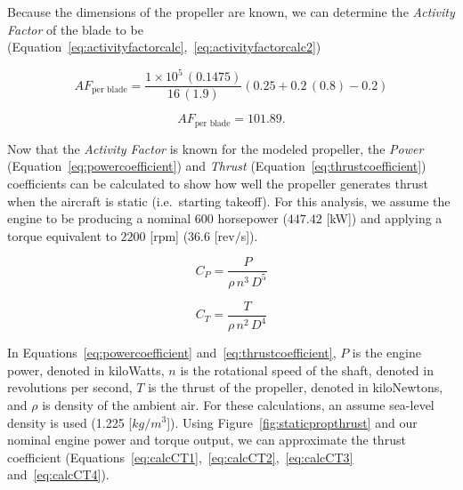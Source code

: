 Because the dimensions of the propeller are known, we can determine the \textit{Activity Factor} of the blade to be (Equation~\ref{eq:activityfactorcalc},~\ref{eq:activityfactorcalc2})

\begin{equation}\label{eq:activityfactorcalc}
    AF_{\textrm{per blade}} = \frac{1 \times 10^5 \, (0.1475)}{16 \, (1.9)} \left(0.25 + 0.2 \, (0.8) - 0.2 \right)
\end{equation}

\begin{equation}\label{eq:activityfactorcalc2}
    AF_{\textrm{per blade}} = 101.89.
\end{equation}

Now that the \textit{Activity Factor} is known for the modeled propeller, the \textit{Power} (Equation~\ref{eq:powercoefficient}) and \textit{Thrust} (Equation~\ref{eq:thrustcoefficient}) coefficients can be calculated to show how well the propeller generates thrust when the aircraft is static (i.e.\ starting takeoff). For this analysis, we assume the engine to be producing a nominal \(600\) horsepower (\(447.42\) [kW]) and applying a torque equivalent to \(2200\) [rpm] (\(36.6\) [rev\(/\)s]).

\begin{equation}\label{eq:powercoefficient}
    C_P = \frac{P}{\rho \, n^3 \, D^5}
\end{equation}

\begin{equation}\label{eq:thrustcoefficient}
    C_T = \frac{T}{\rho \, n^2 \, D^4}
\end{equation}

In Equations~\ref{eq:powercoefficient} and~\ref{eq:thrustcoefficient}, \(P\) is the engine power, denoted in kiloWatts, \(n\) is the rotational speed of the shaft, denoted in revolutions per second, \(T\) is the thrust of the propeller, denoted in kiloNewtons, and \( \rho \) is density of the ambient air. For these calculations, an assume sea-level density is used (1.225 [\(kg/m^3\)]). Using Figure~\ref{fig:staticpropthrust} and our nominal engine power and torque output, we can approximate the thrust coefficient (Equations~\ref{eq:calcCT1},~\ref{eq:calcCT2},~\ref{eq:calcCT3} and~\ref{eq:calcCT4}).

